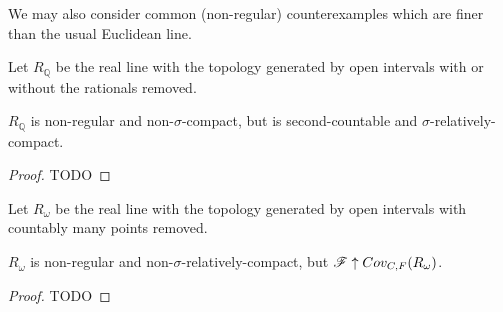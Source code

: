 We may also consider common (non-regular) counterexamples which are finer
than the usual Euclidean line.

\begin{defn}
  Let $R_{\mathbb Q}$ be the real line with the topology generated by open
  intervals with or without the rationals removed.
\end{defn}

\begin{thm}
  $R_{\mathbb Q}$ is non-regular and non-$\sigma$-compact, but is
  second-countable and $\sigma$-relatively-compact.
\end{thm}

\begin{proof}
  TODO
\end{proof}

\begin{defn}
  Let $R_\omega$ be the real line with the topology generated by open
  intervals with countably many points removed.
\end{defn}

\begin{thm}
  $R_\omega$ is non-regular and non-$\sigma$-relatively-compact, but
  $\mathscr{F}\uparrow Cov_{C,F}(R_\omega)$.
\end{thm}

\begin{proof}
  TODO
\end{proof}












